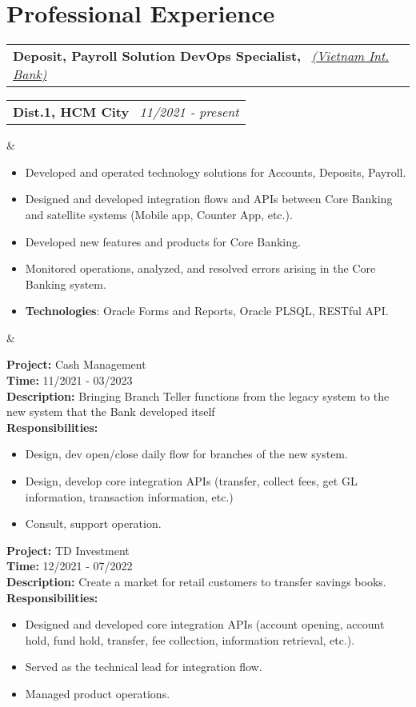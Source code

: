 \documentclass[11pt,a4paper,sans]{moderncv}
\makeatletter
\newcommand*{\customcventry}[7][.13em]{
\begin{tabular}{@{}l}
{\bfseries #4} \
{\itshape #3}
\end{tabular}
\hfill
\begin{tabular}{l@{}}
{\bfseries #5} \
{\itshape #2}
\end{tabular}
\ifx&#7&%
\else{\
\begin{minipage}{\maincolumnwidth}%
\small#7%
\end{minipage}}\fi%
\par\addvspace{#1}}
\makeatother
\begin{document}
\section{Professional Experience}
\customcventry{11/2021 ‐ present}{{\color{blue}\href{https://www.vib.com.vn}{(Vietnam Int. Bank)}}}{Deposit, Payroll Solution DevOps Specialist,}{Dist.1, HCM City}{}{
\vspace*{2mm}
{\begin{itemize}[leftmargin=0.6cm, label={\textbullet}]
\item Developed and operated technology solutions for Accounts, Deposits, Payroll.
\item Designed and developed integration flows and APIs between Core Banking and satellite systems (Mobile app, Counter App, etc.).
\item Developed new features and products for Core Banking.
\item Monitored operations, analyzed, and resolved errors arising in the Core Banking system.
\item[] \textbf{Technologies}: Oracle Forms and Reports, Oracle PLSQL, RESTful API.
\end{itemize}}}

\begin{mdframed}[style=ProjectFrame]
	\textbf{Project:} Cash Management \\
	\textbf{Time:} 11/2021 - 03/2023 \\
	\textbf{Description:} Bringing Branch Teller functions from the legacy system to the new system that the Bank developed itself\\
	\textbf{Responsibilities:}
	\begin{itemize}[leftmargin=0.6cm,noitemsep,topsep=0pt,label=-]
	\item Design, dev open/close daily flow for branches of the new system.
	\item Design, develop core integration APIs (transfer, collect fees, get GL information, transaction information, etc.)
	\item Consult, support operation.
	\end{itemize}
\end{mdframed}

\begin{mdframed}[style=ProjectFrame]
	\textbf{Project:} TD Investment \\
	\textbf{Time:} 12/2021 - 07/2022 \\
	\textbf{Description:} Create a market for retail customers to transfer savings books.\\
	\textbf{Responsibilities:}
	\begin{itemize}[leftmargin=0.6cm,noitemsep,topsep=0pt,label=-]
		\item Designed and developed core integration APIs (account opening, account hold, fund hold, transfer, fee collection, information retrieval, etc.).
		\item Served as the technical lead for integration flow.
		\item Managed product operations.
	\end{itemize}
\end{mdframed}
\end{document}
